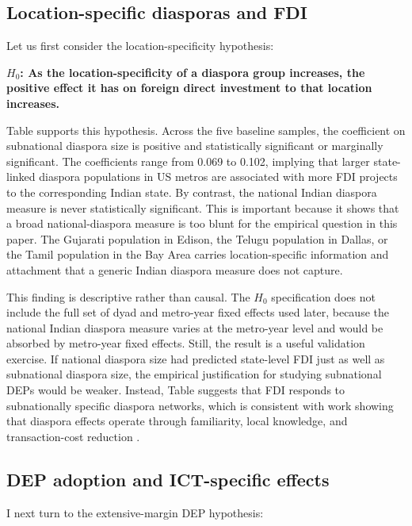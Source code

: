\documentclass[12pt]{article}
\let\oldsubsection\subsection
\renewcommand{\subsection}{\FloatBarrier\oldsubsection}
\begin{document}
\subsection{Location-specific diasporas and FDI}

Let us first consider the location-specificity hypothesis:

\textbf{$H_0$: As the location-specificity of a diaspora group increases, the positive effect it has on foreign direct investment to that location increases.}

Table  supports this hypothesis. Across the five baseline samples, the coefficient on subnational diaspora size is positive and statistically significant or marginally significant. The coefficients range from 0.069 to 0.102, implying that larger state-linked diaspora populations in US metros are associated with more FDI projects to the corresponding Indian state. By contrast, the national Indian diaspora measure is never statistically significant. This is important because it shows that a broad national-diaspora measure is too blunt for the empirical question in this paper. The Gujarati population in Edison, the Telugu population in Dallas, or the Tamil population in the Bay Area carries location-specific information and attachment that a generic Indian diaspora measure does not capture.

This finding is descriptive rather than causal. The $H_0$ specification does not include the full set of dyad and metro-year fixed effects used later, because the national Indian diaspora measure varies at the metro-year level and would be absorbed by metro-year fixed effects. Still, the result is a useful validation exercise. If national diaspora size had predicted state-level FDI just as well as subnational diaspora size, the empirical justification for studying subnational DEPs would be weaker. Instead, Table  suggests that FDI responds to subnationally specific diaspora networks, which is consistent with work showing that diaspora effects operate through familiarity, local knowledge, and transaction-cost reduction \citep{leblang_familiarity_2010, kugler_migration_2018, useche_highly_2020}.

\subsection{DEP adoption and ICT-specific effects}

I next turn to the extensive-margin DEP hypothesis:
\end{document}
